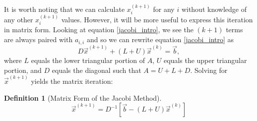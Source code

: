 \documentclass[12pt,letterpaper]{article}
\theoremstyle{definition}
\newtheorem{defn}[thm]{Definition}
\begin{document}
\noindent It is worth noting that we can calculate $x_i^{(k+1)}$ for any $i$ without knowledge of any other $x_i^{(k+1)}$ values. However, it will be more useful to express this iteration in matrix form. Looking at equation \ref{jacobi_intro}, we see the $(k+1)$ terms are always paired with $a_{i,i}$ and so we can rewrite equation \ref{jacobi_intro} as $$D\vec{x}^{(k+1)} + (L+U)\vec{x}^{(k)} = \vec{b},$$ where $L$ equals the lower triangular portion of $A$, $U$ equals the upper triangular portion, and $D$ equals the diagonal such that $A=U+L+D$. Solving for $\vec{x}^{(k+1)}$ yields the matrix iteration: 

\begin{defn}[Matrix Form of the Jacobi Method]
$$\vec{x}^{(k+1)}=D^{-1}\left[\vec{b}-(L+U)\vec{x}^{(k)}\right]$$
\end{defn}
\end{document}
